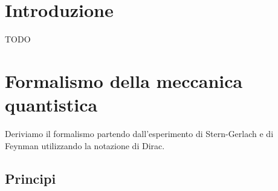 \documentclass[a4paper]{article}
\begin{document}


\tableofcontents
\pagebreak

\section{Introduzione}
TODO

\section{Formalismo della meccanica quantistica}
Deriviamo il formalismo partendo dall'esperimento di Stern-Gerlach e di Feynman utilizzando la
notazione di Dirac.

\subsection{Principi}
\end{document}
